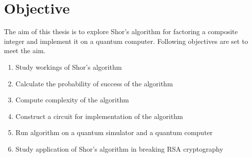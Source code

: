 \section{Objective}
 The aim of this thesis is to explore Shor's algorithm for factoring a composite integer and implement it on a quantum computer.
 Following objectives are set to meet the aim.
 \begin{enumerate}
     \item Study workings of Shor's algorithm
     \item Calculate the probability of success of the algorithm
     \item Compute complexity of the algorithm
     \item Construct a circuit for implementation of the algorithm
     \item Run algorithm on a quantum simulator and a quantum computer
     \item Study application of Shor's algorithm in breaking RSA cryptography
 \end{enumerate}